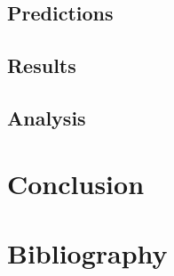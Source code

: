 \documentclass{article}
\begin{document}
\subsection{Predictions}\subsection{Results}\subsection{Analysis}\section{Conclusion}



\section*{Bibliography}
\end{document}
